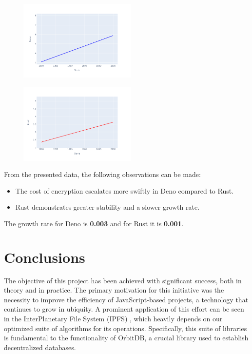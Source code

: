 \documentclass[10pt,journal,compsoc]{IEEEtran}
\begin{document}
\begin{figure}[H]
    \centering
    \includegraphics[width=0.52\textwidth]{trend_box_deno}
\end{figure}

\begin{figure}[H]
    \centering
    \includegraphics[width=0.52\textwidth]{images/trend_box_rust}
\end{figure}

From the presented data, the following observations can be made:
\begin{itemize}
    \item The cost of encryption escalates more swiftly in Deno compared to Rust.
    \item Rust demonstrates greater stability and a slower growth rate.
\end{itemize}

The growth rate for Deno is \textbf{0.003} and for Rust it is \textbf{0.001}.

\section{Conclusions}

The objective of this project has been achieved with significant success, both in theory and in practice. The primary motivation for this initiative was the necessity to improve the efficiency of JavaScript-based projects, a technology that continues to grow in ubiquity. A prominent application of this effort can be seen in the InterPlanetary File System (IPFS) \cite{IPFS}, which heavily depends on our optimized suite of algorithms for its operations. Specifically, this suite of libraries is fundamental to the functionality of OrbitDB, a crucial library used to establish decentralized databases.
\end{document}
